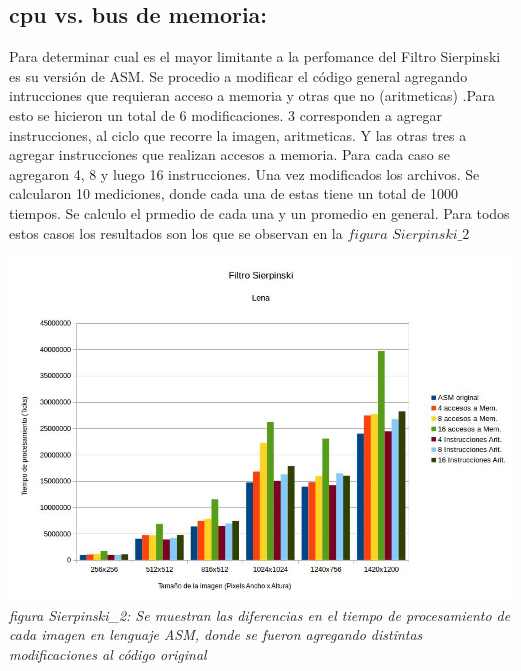 \documentclass[a4paper]{article}
\begin{document}
\subsection*{cpu vs. bus de memoria:}

Para determinar cual es el mayor limitante a la perfomance del Filtro Sierpinski es su versión de ASM. Se procedio a modificar el código general agregando intrucciones que requieran acceso a memoria y otras que no (aritmeticas) .Para esto se hicieron un total de 6 modificaciones. 3 corresponden a agregar instrucciones, al ciclo que recorre la imagen, aritmeticas. Y las otras tres a agregar instrucciones que realizan accesos a memoria. Para cada caso se agregaron 4, 8 y luego 16 instrucciones. Una vez modificados los archivos. Se calcularon 10 mediciones, donde cada una de estas tiene un total de 1000 tiempos. Se calculo el prmedio de cada una y un promedio en general. Para todos estos casos los resultados son los que se observan en la $figura$ $Sierpinski\_2$ 

\vspace{1cm}
\includegraphics[width=\textwidth,height=\textheight,keepaspectratio
]{sierpseg.jpg}
\textit{figura Sierpinski\_2: Se muestran las diferencias en el tiempo de procesamiento de cada imagen en lenguaje ASM, donde se fueron agregando distintas modificaciones al código original} \newline \newline
\end{document}
